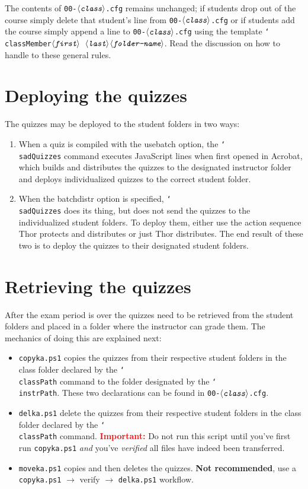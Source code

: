 \documentclass{article}
\def\cs#1{\texttt{\char`\\#1}}
\let\opt\textsf
\let\app\textsf
\def\ameta#1{\ensuremath{\langle\textit{\texttt{#1}}\rangle}}
\def\darg#1{\texttt{\char123\relax#1\char125\relax}}
\begin{document}
The contents of \texttt{00-\ameta{class}.cfg} remains unchanged; if students
drop out of the course simply delete that student's line from
\texttt{00-\ameta{class}.cfg} or if students add the course simply append a
line to \texttt{00-\ameta{class}.cfg} using the template
\cs{classMember\darg{\ameta{first}}\relax
\darg{\ameta{last}}\darg{\ameta{folder-name}}}. Read the discussion on how to
handle  to these general rules.

\section{Deploying the quizzes}

The quizzes may be deployed to the student folders in two ways:
\begin{enumerate}
    \item When a quiz is compiled with the \opt{usebatch} option, the
        \cs{sadQuizzes} command executes JavaScript lines when first opened
        in \app{Acrobat}, which builds and distributes the quizzes to the
        designated instructor folder and deploys individualized quizzes to
        the correct student folder.
    \item When the \opt{batchdistr} option is specified,
        \cs{sadQuizzes} does its thing, but does not send the
        quizzes to the individualized student folders. To
        deploy them, either use the action sequence
        \textsf{Thor protects and distributes} or just
        \textsf{Thor distributes}. The end result of these two
        is to deploy the quizzes to their designated student
        folders.
\end{enumerate}

\section{Retrieving the quizzes}

After the exam period is over the quizzes need to be retrieved
from the student folders and placed in a folder where the
instructor can grade them. The mechanics of doing this are
explained next:
\begin{itemize}
  \item \texttt{copyka.ps1} copies the quizzes from their respective student folders
    in the class folder declared by the \cs{classPath} command to the folder designated
    by the \cs{instrPath}. These two declarations can be found in \texttt{00-\ameta{class}.cfg}.
  \item \texttt{delka.ps1} delete the quizzes from their
      respective student folders in the class folder declared
      by the \cs{classPath} command.
      \textcolor{red}{\textbf{Important:}} Do not run this
      script until you've first run \texttt{copyka.ps1}
      \emph{and} you've \emph{verified} all files have indeed been
      transferred.
  \item \texttt{moveka.ps1} copies and then deletes the
      quizzes. \textbf{Not recommended}, use a \texttt{copyka.ps1} $\rightarrow$ verify
      $\rightarrow$ \texttt{delka.ps1} workflow.
\end{itemize}
\end{document}

